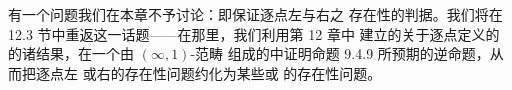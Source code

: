 有一个问题我们在本章不予讨论：即保证逐点左\trExtension{}与右\trExtension{}之
存在性的判据。我们将在 12.3 节中重返这一话题——在那里，我们利用第 12 章中
建立的关于逐点定义的\trUniversalProperty{}的诸结果，在一个由 $(\infty,1)$-范畴
组成的\trInfinityCosmos{}中证明命题 9.4.9 所预期的逆命题，从而把逐点左%
\trExtension{}或右\trExtension{}的存在性问题约化为某些\trColimit{}或\trLimit{}%
的存在性问题。

